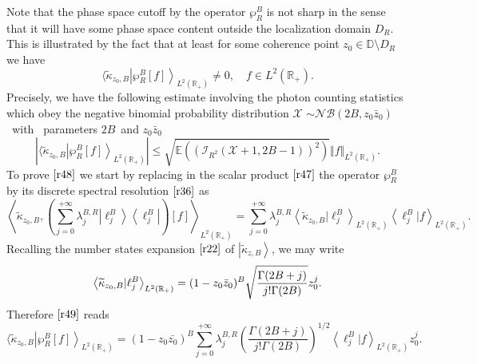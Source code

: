 Note that the phase space cutoff by the operator $\wp _{R}^{B}$ is not sharp
in the sense that it will have some phase space content outside the
localization domain $D_{R}$. This is illustrated by the fact that at least
for some coherence point $z_{0}\in \mathbb{D}\setminus D_{R}$ we have 
\begin{equation}
\label{r47}
\langle \widetilde{\kappa }_{z_{0},B}\left\vert \wp _{R}^{B}[f]\right\rangle
_{L^{2}(\mathbb{R}_{+})}\neq 0,\quad f\in L^{2}(\mathbb{R}_{+}).  
\end{equation}
Precisely, we have the following estimate involving the photon counting
statistics which obey the negative binomial probability distribution $%
\mathcal{X}$ $\sim \mathcal{NB}(2B,z_{0}\bar{z}_{0})$\textit{\ }with\textit{%
\ }parameters $2B$\ and $z_{0}\bar{z}_{0}$ 
\begin{equation}
\label{r48}
\left\vert \langle \widetilde{\kappa }_{z_{0},B}\left\vert \wp
_{R}^{B}[f]\right\rangle _{L^{2}\left( \mathbb{R}_{+}\right) }\right\vert
\leq \sqrt{\mathbb{E}\left( \left( \mathcal{I}_{R^{2}}\left( \mathcal{X+}%
1,2B-1\right) \right) ^{2}\right) }\Vert f\Vert _{L^{2}\left( \mathbb{R}%
_{+}\right) } . 
\end{equation}
To prove $\eqref{r48}$ we start by replacing in the scalar product 
$\eqref{r47}$ the operator $\wp _{R}^{B}$ by its discrete spectral
resolution $\eqref{r36}$ as 
\begin{equation}
\label{r49}
\left\langle \widetilde{\kappa }_{z_{0},B},\left( \sum_{j=0}^{+\infty
}\lambda _{j}^{B,R}\left\vert \ell _{j}^{B}\right\rangle \left\langle \ell
_{j}^{B}\right\vert \right) [f]\right\rangle _{L^{2}(\mathbb{R}%
_{+})}=\sum_{j=0}^{+\infty }\lambda _{j}^{B,R}\left\langle \widetilde{\kappa 
}_{z_{0},B}|\ell _{j}^{B}\right\rangle _{L^{2}\left( \mathbb{R}_{+}\right)
}\left\langle \ell _{j}^{B}|f\right\rangle _{L^{2}\left( \mathbb{R}%
_{+}\right) }.  
\end{equation}
Recalling the number states expansion $\eqref{r22} $ of $\left\vert 
\widetilde{\kappa }_{z,B}\right\rangle $, we may write 
\begin{equation}
\label{r50}
\left\langle \widetilde{\kappa }_{z_{0},B}|\ell _{j}^{B}\right\rangle
_{L^{2}\left( \mathbb{R}_{+}\right) }=(1-z_{0}\bar{z}_{0})^{B}\sqrt{\frac{%
\Gamma (2B+j)}{j!\Gamma (2B)}}z_{0}^{j}.  
\end{equation}
Therefore $\eqref{r49} $ reads 
\begin{equation}
\label{r51}
\langle \widetilde{\kappa }_{z_{0},B}\left\vert \wp _{R}^{B}[f]\right\rangle
_{L^{2}\left( \mathbb{R}_{+}\right) }=(1-z_{0}\bar{z_{0}})^{B}\sum_{j=0}^{+%
\infty }\lambda _{j}^{B,R}\left( \frac{\Gamma (2B+j)}{j!\Gamma (2B)}\right)
^{1/2}\left\langle \ell _{j}^{B}|f\right\rangle _{L^{2}\left( \mathbb{R}%
_{+}\right) }z_{0}^{j}.  
\end{equation}
